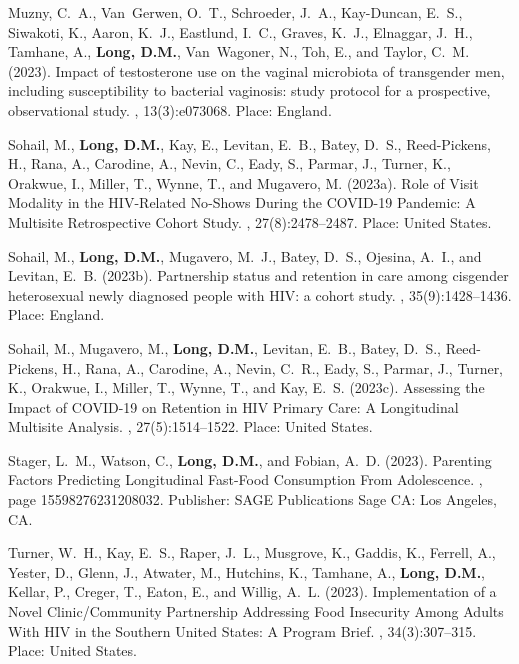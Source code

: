 \begin{thebibliography}{}
Muzny, C.~A., Van~Gerwen, O.~T., Schroeder, J.~A., Kay-Duncan, E.~S., Siwakoti,
  K., Aaron, K.~J., Eastlund, I.~C., Graves, K.~J., Elnaggar, J.~H., Tamhane,
  A., \textbf{Long, D.M.}, Van~Wagoner, N., Toh, E., and Taylor, C.~M. (2023).
\newblock Impact of testosterone use on the vaginal microbiota of transgender
  men, including susceptibility to bacterial vaginosis: study protocol for a
  prospective, observational study.
, 13(3):e073068.
\newblock Place: England.

Sohail, M., \textbf{Long, D.M.}, Kay, E., Levitan, E.~B., Batey, D.~S., Reed-Pickens, H.,
  Rana, A., Carodine, A., Nevin, C., Eady, S., Parmar, J., Turner, K., Orakwue,
  I., Miller, T., Wynne, T., and Mugavero, M. (2023a).
\newblock Role of {Visit} {Modality} in the {HIV}-{Related} {No}-{Shows}
  {During} the {COVID}-19 {Pandemic}: {A} {Multisite} {Retrospective} {Cohort}
  {Study}.
, 27(8):2478--2487.
\newblock Place: United States.

Sohail, M., \textbf{Long, D.M.}, Mugavero, M.~J., Batey, D.~S., Ojesina, A.~I., and
  Levitan, E.~B. (2023b).
\newblock Partnership status and retention in care among cisgender heterosexual
  newly diagnosed people with {HIV}: a cohort study.
, 35(9):1428--1436.
\newblock Place: England.

Sohail, M., Mugavero, M., \textbf{Long, D.M.}, Levitan, E.~B., Batey, D.~S., Reed-Pickens,
  H., Rana, A., Carodine, A., Nevin, C.~R., Eady, S., Parmar, J., Turner, K.,
  Orakwue, I., Miller, T., Wynne, T., and Kay, E.~S. (2023c).
\newblock Assessing the {Impact} of {COVID}-19 on {Retention} in {HIV}
  {Primary} {Care}: {A} {Longitudinal} {Multisite} {Analysis}.
, 27(5):1514--1522.
\newblock Place: United States.

Stager, L.~M., Watson, C., \textbf{Long, D.M.}, and Fobian, A.~D. (2023).
\newblock Parenting {Factors} {Predicting} {Longitudinal} {Fast}-{Food}
  {Consumption} {From} {Adolescence}.
, page 15598276231208032.
\newblock Publisher: SAGE Publications Sage CA: Los Angeles, CA.

Turner, W.~H., Kay, E.~S., Raper, J.~L., Musgrove, K., Gaddis, K., Ferrell, A.,
  Yester, D., Glenn, J., Atwater, M., Hutchins, K., Tamhane, A., \textbf{Long, D.M.},
  Kellar, P., Creger, T., Eaton, E., and Willig, A.~L. (2023).
\newblock Implementation of a {Novel} {Clinic}/{Community} {Partnership}
  {Addressing} {Food} {Insecurity} {Among} {Adults} {With} {HIV} in the
  {Southern} {United} {States}: {A} {Program} {Brief}.
,
  34(3):307--315.
\newblock Place: United States.


\end{thebibliography}
